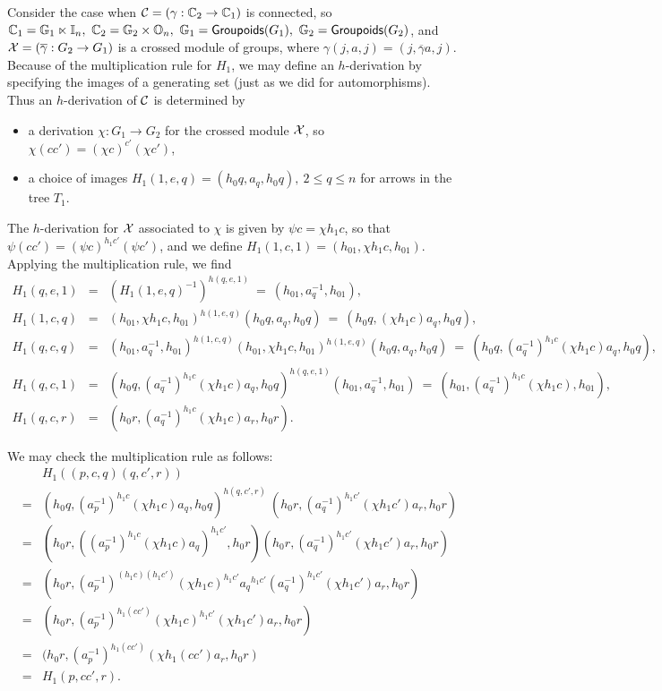 \medskip
Consider the case when $\mathcal{C} = (\gamma : \mathbb{C}_2 \to \mathbb{C}_1)$ is connected, 
so $\mathbb{C}_1 = \mathbb{G}_1 \ltimes \mathbb{I}_n,~ \mathbb{C}_2 = \mathbb{G}_2 \times \mathbb{O}_n,~ 
\mathbb{G}_1 = {\sf Groupoids}(G_1),~ \mathbb{G}_2 = {\sf Groupoids}(G_2)$, and 
$\mathcal{X} = (\overline{\gamma} : G_2 \to G_1)$ is a crossed module of groups, 
where $\gamma(j,a,j) = (j,\overline{\gamma}a,j)$. 
Because of the multiplication rule for $H_1$, we may define an $h$-derivation 
by specifying the images of a generating set 
(just as we did for automorphisms).  
Thus an $h$-derivation of $\mathcal{C}$ is determined by 
\begin{itemize}
\item
a derivation $\chi : G_1 \to G_2$ for the crossed module $\mathcal{X}$, 
so $\chi(cc') = (\chi c)^{c'}(\chi c')$, 
\item
a choice of images $H_1(1,e,q) = (h_0q,a_q,h_0q),~ 2 \leqslant q \leqslant n$ 
for arrows in the tree $T_1$. 
\end{itemize}
The $h$-derivation for $\mathcal{X}$ associated to $\chi$ 
is given by $\psi c = \chi h_1 c$, 
so that $\psi(cc') = (\psi c)^{h_1 c'}(\psi c')$, 
and we define $H_1(1,c,1) = (h_01,\chi h_1 c, h_01)$. 
Applying the multiplication rule, we find 
\begin{eqnarray*}
H_1(q,e,1) &=& (H_1(1,e,q)^{-1})^{h(q,e,1)} 
               ~=~ (h_01,a_q^{-1},h_01), \\
H_1(1,c,q) &=& (h_01,\chi h_1c,h_01)^{h(1,e,q)}(h_0q,a_q,h_0q) 
               ~=~ (h_0q,(\chi h_1 c)a_q,h_0q), \\
H_1(q,c,q) &=& (h_01,a_q^{-1},h_01)^{h(1,c,q)}
                (h_01,\chi h_1c,h_01)^{h(1,e,q)}(h_0q,a_q,h_0q) 
               ~=~ (h_0q,(a_q^{-1})^{h_1c}(\chi h_1c)a_q,h_0q), \\
H_1(q,c,1) &=& (h_0q,(a_q^{-1})^{h_1c}(\chi h_1 c)a_q,h_0q)^{h(q,e,1)} 
                (h_01,a_q^{-1},h_01) 
               ~=~ (h_01,(a_q^{-1})^{h_1c}(\chi h_1c),h_01), \\
H_1(q,c,r) &=& (h_0r,(a_q^{-1})^{h_1c}(\chi h_1c)a_r,h_0r). 
\end{eqnarray*}

\medskip\noindent
We may check the multiplication rule as follows: 
\begin{eqnarray*}
 & &  H_1 \left( (p,c,q)(q,c',r) \right) \\
 &=&  (h_0q,(a_p^{-1})^{h_1c}(\chi h_1c)a_q,h_0q)^{h(q,c',r)}~
       (h_0r,(a_q^{-1})^{h_1c'}(\chi h_1c')a_r,h_0r) \\ 
 &=&  (h_0r,((a_p^{-1})^{h_1c}(\chi h_1c)a_q)^{h_1c'},h_0r) 
       (h_0r,(a_q^{-1})^{h_1c'}(\chi h_1c')a_r,h_0r) \\ 
 &=&  (h_0r,(a_p^{-1})^{(h_1c)(h_1c')}(\chi h_1c)^{h_1c'}{a_q}^{h_1c'} 
             (a_q^{-1})^{h_1c'}(\chi h_1c')a_r,h_0r) \\ 
 &=&  (h_0r,(a_p^{-1})^{h_1(cc')}(\chi h_1c)^{h_1c'}(\chi h_1c')a_r,h_0r) \\ 
 &=&  (h_0r,(a_p^{-1})^{h_1(cc')}(\chi h_1(cc')a_r,h_0r) \\ 
 &=&  H_1(p,cc',r).
\end{eqnarray*}


